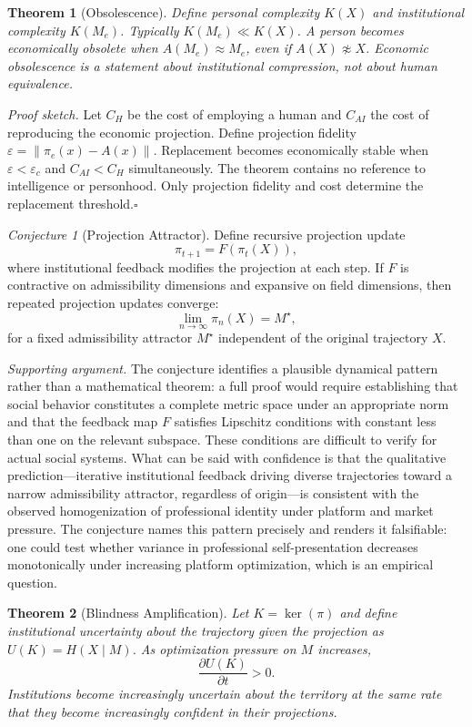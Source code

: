 \documentclass[12pt, a4paper]{article}
\theoremstyle{plain}
\newtheorem{theorem}{Theorem}
\theoremstyle{definition}
\theoremstyle{remark}
\newtheorem{conjecture}{Conjecture}
\begin{document}
\begin{theorem}[Obsolescence]
Define personal complexity $K(X)$ and institutional complexity $K(M_e)$.
Typically $K(M_e) \ll K(X)$.
A person becomes economically obsolete when $A(M_e) \approx M_e$, even if
$A(X) \not\approx X$.
Economic obsolescence is a statement about institutional compression,
not about human equivalence.
\end{theorem}

\textit{Proof sketch.}
Let $C_H$ be the cost of employing a human and $C_{AI}$ the cost of reproducing
the economic projection.
Define projection fidelity $\varepsilon = \|\pi_e(x) - A(x)\|$.
Replacement becomes economically stable when $\varepsilon < \varepsilon_c$
and $C_{AI} < C_H$ simultaneously.
The theorem contains no reference to intelligence or personhood.
Only projection fidelity and cost determine the replacement threshold.\hfill$\square$

\begin{conjecture}[Projection Attractor]
Define recursive projection update
\[
\pi_{t+1} = F(\pi_t(X)),
\]
where institutional feedback modifies the projection at each step.
If $F$ is contractive on admissibility dimensions and expansive on field dimensions,
then repeated projection updates converge:
\[
\lim_{n\to\infty} \pi_n(X) = M^\star,
\]
for a fixed admissibility attractor $M^\star$ independent of the original trajectory $X$.
\end{conjecture}

\textit{Supporting argument.}
The conjecture identifies a plausible dynamical pattern rather than a mathematical
theorem: a full proof would require establishing that social behavior constitutes
a complete metric space under an appropriate norm and that the feedback map $F$
satisfies Lipschitz conditions with constant less than one on the relevant subspace.
These conditions are difficult to verify for actual social systems.
What can be said with confidence is that the qualitative prediction---iterative
institutional feedback driving diverse trajectories toward a narrow admissibility
attractor, regardless of origin---is consistent with the observed homogenization
of professional identity under platform and market pressure.
The conjecture names this pattern precisely and renders it falsifiable:
one could test whether variance in professional self-presentation decreases monotonically
under increasing platform optimization, which is an empirical question.

\begin{theorem}[Blindness Amplification]
Let $K = \ker(\pi)$ and define institutional uncertainty about the trajectory given
the projection as $U(K) = H(X \mid M)$.
As optimization pressure on $M$ increases,
\[
\frac{\partial U(K)}{\partial t} > 0.
\]
Institutions become increasingly uncertain about the territory at the same rate
that they become increasingly confident in their projections.
\end{theorem}
\end{document}
